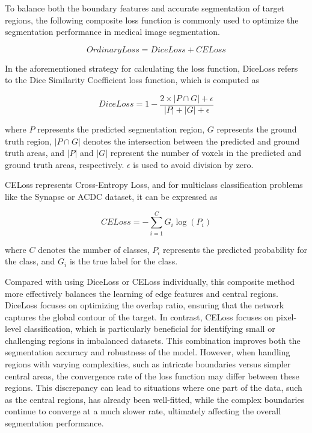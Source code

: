 \documentclass[sn-mathphys-num]{sn-jnl}
\theoremstyle{thmstyleone}%
\theoremstyle{thmstyletwo}%
\theoremstyle{thmstylethree}%
\begin{document}
To balance both the boundary features and accurate segmentation of target regions, the following composite loss function is commonly used to optimize the segmentation performance in medical image segmentation.

\begin{equation}
    OrdinaryLoss = DiceLoss + CELoss\label{eq13}
\end{equation}

In the aforementioned strategy for calculating the loss function, DiceLoss refers to the Dice Similarity Coefficient loss function, which is computed as

\begin{equation}
    DiceLoss = 1-\frac{2\times\left|P\cap G\right|+\epsilon}{\left|P\right|+\left|G\right|+\epsilon}\label{eq14}
\end{equation}

where \(P\) represents the predicted segmentation region, \(G\) represents the ground truth region, \(\left|P\cap G\right|\) denotes the intersection between the predicted and ground truth areas,
and \(\left|P\right|\) and \(\left|G\right|\) represent the number of voxels in the predicted and ground truth areas, respectively.
\(\epsilon\) is used to avoid division by zero.

CELoss represents Cross-Entropy Loss, and for multiclass classification problems like the Synapse or ACDC dataset, it can be expressed as

\begin{equation}
    CELoss = -\sum_{i=1}^{C}{G_i\log{\left(P_i\right)}}\label{eq15}
\end{equation}

where \(C\) denotes the number of classes, \(P_i\) represents the predicted probability for the class, and \(G_i\) is the true label for the class.

Compared with using DiceLoss or CELoss individually, this composite method more effectively balances the learning of edge features and central regions.
DiceLoss focuses on optimizing the overlap ratio, ensuring that the network captures the global contour of the target.
In contrast, CELoss focuses on pixel-level classification, which is particularly beneficial for identifying small or challenging regions in imbalanced datasets.
This combination improves both the segmentation accuracy and robustness of the model.
However, when handling regions with varying complexities, such as intricate boundaries versus simpler central areas, the convergence rate of the loss function may differ between these regions.
This discrepancy can lead to situations where one part of the data, such as the central regions, has already been well-fitted, while the complex boundaries continue to converge at a much slower rate,
ultimately affecting the overall segmentation performance.
\end{document}
